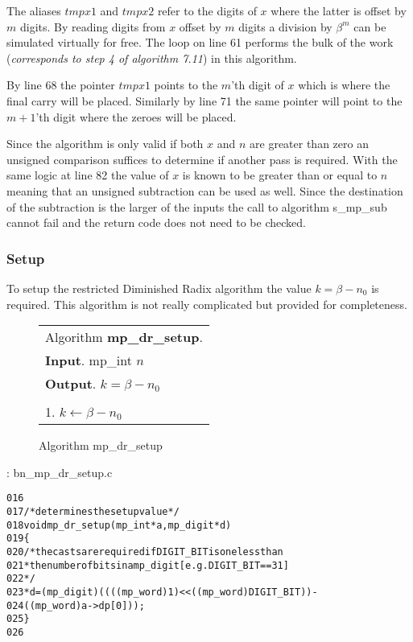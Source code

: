 \documentclass[b5paper]{book}
\begin{document}
The aliases $tmpx1$ and $tmpx2$ refer to the digits of $x$ where the latter is offset by $m$ digits.  By reading digits from $x$ offset by $m$ digits
a division by $\beta^m$ can be simulated virtually for free.  The loop on line 61 performs the bulk of the work (\textit{corresponds to step 4 of algorithm 7.11})
in this algorithm.

By line 68 the pointer $tmpx1$ points to the $m$'th digit of $x$ which is where the final carry will be placed.  Similarly by line 71 the 
same pointer will point to the $m+1$'th digit where the zeroes will be placed.  

Since the algorithm is only valid if both $x$ and $n$ are greater than zero an unsigned comparison suffices to determine if another pass is required.  
With the same logic at line 82 the value of $x$ is known to be greater than or equal to $n$ meaning that an unsigned subtraction can be used
as well.  Since the destination of the subtraction is the larger of the inputs the call to algorithm s\_mp\_sub cannot fail and the return code
does not need to be checked.

\subsubsection{Setup}
To setup the restricted Diminished Radix algorithm the value $k = \beta - n_0$ is required.  This algorithm is not really complicated but provided for
completeness.

\begin{figure}[!here]
\begin{small}
\begin{center}
\begin{tabular}{l}
\hline Algorithm \textbf{mp\_dr\_setup}. \\
\textbf{Input}.   mp\_int $n$ \\
\textbf{Output}.  $k = \beta - n_0$ \\
\hline \\
1.  $k \leftarrow \beta - n_0$ \\
\hline
\end{tabular}
\end{center}
\end{small}
\caption{Algorithm mp\_dr\_setup}
\end{figure}

\vspace{+3mm}\begin{small}
\hspace{-5.1mm}{\bf File}: bn\_mp\_dr\_setup.c
\vspace{-3mm}
\begin{alltt}
016   
017   /* determines the setup value */
018   void mp_dr_setup(mp_int *a, mp_digit *d)
019   \{
020      /* the casts are required if DIGIT_BIT is one less than
021       * the number of bits in a mp_digit [e.g. DIGIT_BIT==31]
022       */
023      *d = (mp_digit)((((mp_word)1) << ((mp_word)DIGIT_BIT)) - 
024           ((mp_word)a->dp[0]));
025   \}
026   
\end{alltt}
\end{small}
\end{document}
